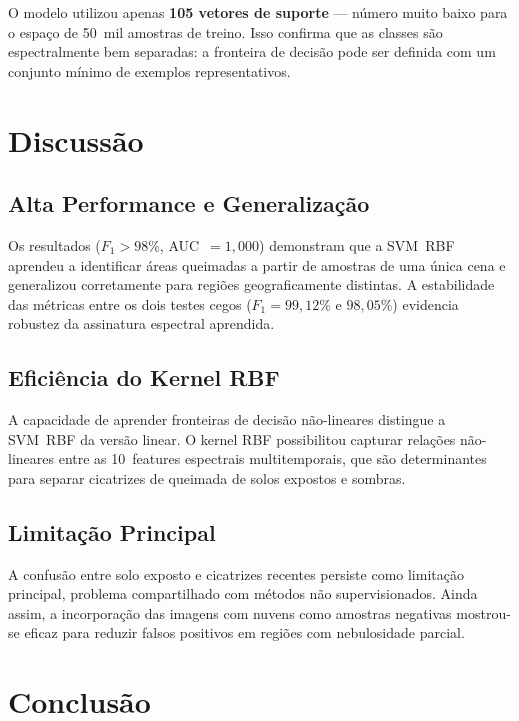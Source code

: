 \documentclass[conference]{IEEEtran}
\begin{document}
O modelo utilizou apenas \textbf{105 vetores de suporte} — número muito
baixo para o espaço de 50~mil amostras de treino. Isso confirma que as
classes são espectralmente bem separadas: a fronteira de decisão pode ser
definida com um conjunto mínimo de exemplos representativos.

\section{Discussão}

\subsection{Alta Performance e Generalização}

Os resultados ($F_1 > 98\%$, AUC~$= 1{,}000$) demonstram que a SVM~RBF
aprendeu a identificar áreas queimadas a partir de amostras de uma única
cena e generalizou corretamente para regiões geograficamente distintas.
A estabilidade das métricas entre os dois testes cegos ($F_1 = 99{,}12\%$
e $98{,}05\%$) evidencia robustez da assinatura espectral aprendida.

\subsection{Eficiência do Kernel RBF}

A capacidade de aprender fronteiras de decisão não-lineares distingue a
SVM~RBF da versão linear. O kernel RBF possibilitou capturar relações
não-lineares entre as 10~features espectrais multitemporais, que são
determinantes para separar cicatrizes de queimada de solos expostos
e sombras.

\subsection{Limitação Principal}

A confusão entre solo exposto e cicatrizes recentes persiste como
limitação principal, problema compartilhado com métodos não
supervisionados. Ainda assim, a incorporação das imagens com nuvens como
amostras negativas mostrou-se eficaz para reduzir falsos positivos em
regiões com nebulosidade parcial.

\section{Conclusão}
\end{document}
